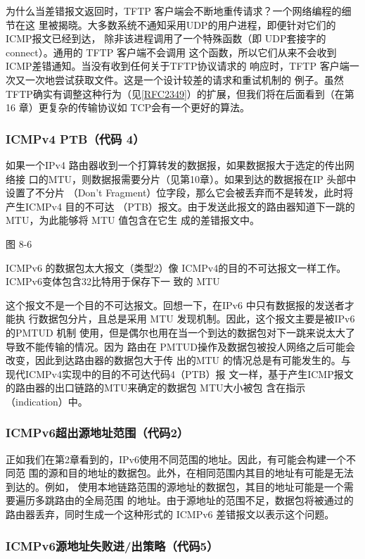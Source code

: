 为什么当差错报文返回时，TFTP 客户端会不断地重传请求？一个网络编程的细节在这
里被揭晓。大多数系统不通知采用UDP的用户进程，即便针对它们的ICMP报文已经到达，
除非该进程调用了一个特殊函数（即 UDP套接字的 connect）。通用的 TFTP 客户端不会调用
这个函数，所以它们从来不会收到ICMP差错通知。当没有收到任何关于TFTP协议请求的
响应时，TFTP 客户端一次又一次地尝试获取文件。这是一个设计较差的请求和重试机制的
例子。虽然
TFTP确实有调整这种行为（见\href{https://www.rfc-editor.org/rfc/rfc2349}{[RFC2349]}）的扩展，但我们将在后面看到（在第
16 章）更复杂的传输协议如 TCP会有一个更好的算法。

\subsubsection{ICMPv4 PTB（代码 4）}
如果一个IPv4 路由器收到一个打算转发的数据报，如果数据报大于选定的传出网络接
口的MTU，则数据报需要分片（见第10章）。如果到达的数据报在IP 头部中设置了不分片
（Don't Fragment）位字段，那么它会被丢弃而不是转发，此时将产生ICMPv4 目的不可达
（PTB）报文。由于发送此报文的路由器知道下一跳的MTU，为此能够将 MTU 值包含在它生
成的差错报文中。

图 8-6

ICMPv6 的数据包太大报文（类型2）像
ICMPv4的目的不可达报文一样工作。
ICMPv6变体包含32比特用于保存下一
致的 MTU

这个报文不是一个目的不可达报文。回想一下，在IPv6 中只有数据报的发送者才能执
行数据包分片，且总是采用 MTU 发现机制。因此，这个报文主要是被IPv6 的PMTUD 机制
使用，但是偶尔也用在当一个到达的数据包对下一跳来说太大了导致不能传输的情况。因为
路由在 PMTUD操作及数据包被投人网络之后可能会改变，因此到达路由器的数据包大于传
出的MTU 的情况总是有可能发生的。与现代ICMPv4实现中的目的不可达代码4（PTB）报
文一样，基于产生ICMP报文的路由器的出口链路的MTU来确定的数据包 MTU大小被包
含在指示（indication）中。

\subsubsection{ICMPv6超出源地址范围（代码2）}
正如我们在第2章看到的，IPv6使用不同范围的地址。因此，有可能会构建一个不同范
围的源和目的地址的数据包。此外，在相同范围内其目的地址有可能是无法到达的。例如，
使用本地链路范围的源地址的数据包，其目的地址可能是一个需要遍历多跳路由的全局范围
的地址。由于源地址的范围不足，数据包将被通过的路由器丢弃，同时生成一个这种形式的
ICMPv6 差错报文以表示这个问题。

\subsubsection{ICMPv6源地址失败进/出策略（代码5）}

